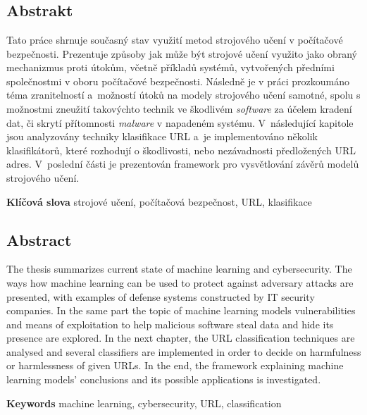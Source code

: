 \chapter*{}

\section*{Abstrakt}

Tato práce shrnuje současný stav využití metod strojového učení v počítačové bezpečnosti.
Prezentuje způsoby jak může být strojové učení využito jako obraný mechanizmus proti útokům, včetně příkladů systémů, vytvořených předními společnostmi v oboru počítačové bezpečnosti.
Následně je v práci prozkoumáno téma zranitelností a~možností útoků na modely strojového učení samotné, spolu s možnostmi zneužití takovýchto technik ve škodlivém \textit{software} za účelem kradení dat, či skrytí přítomnosti \textit{malware} v napadeném systému.
V~následující kapitole jsou analyzovány techniky klasifikace URL a~je implementováno několik klasifikátorů, které rozhodují o škodlivosti, nebo nezávadnosti předložených URL adres.
V~poslední části je prezentován framework pro vysvětlování závěrů modelů strojového učení.

\vspace{5mm}

\textbf{Klíčová slova} strojové učení, počítačová bezpečnost, URL, klasifikace

\vspace{20mm}

\section*{Abstract}

The thesis summarizes current state of machine learning and cybersecurity.
The ways how machine learning can be used to protect against adversary attacks are presented, with examples of defense systems constructed by IT security companies.
In the same part the topic of machine learning models vulnerabilities and means of exploitation to help malicious software steal data and hide its presence are explored.
In the next chapter, the URL classification techniques are analysed and several classifiers are implemented in order to decide on harmfulness or harmlessness of given URLs.
In the end, the framework explaining machine learning models' conclusions and its possible applications is investigated.

\vspace{5mm}

\textbf{Keywords} machine learning, cybersecurity, URL, classification
